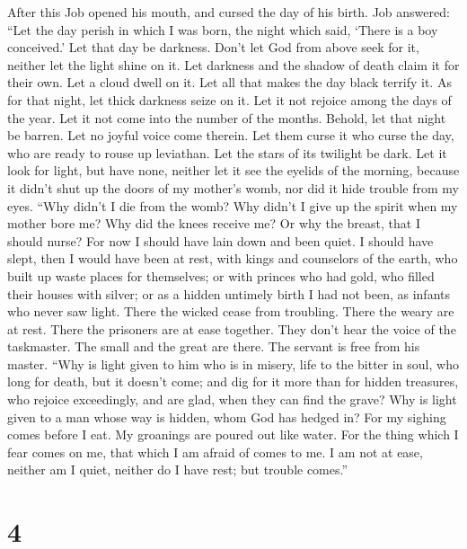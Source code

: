  After this Job opened his mouth, and cursed the day of his
birth.  Job answered:  ``Let the day perish in
which I was born, the night which said, `There is a boy conceived.'
 Let that day be darkness. Don't let God from above seek for
it, neither let the light shine on it.  Let darkness and the
shadow of death claim it for their own. Let a cloud dwell on it. Let all
that makes the day black terrify it.  As for that night, let
thick darkness seize on it. Let it not rejoice among the days of the
year. Let it not come into the number of the months. 
Behold, let that night be barren. Let no joyful voice come therein.
 Let them curse it who curse the day, who are ready to rouse
up leviathan.  Let the stars of its twilight be dark. Let it
look for light, but have none, neither let it see the eyelids of the
morning,  because it didn't shut up the doors of my
mother's womb, nor did it hide trouble from my eyes.  ``Why
didn't I die from the womb? Why didn't I give up the spirit when my
mother bore me?  Why did the knees receive me? Or why the
breast, that I should nurse?  For now I should have lain
down and been quiet. I should have slept, then I would have been at
rest,  with kings and counselors of the earth, who built up
waste places for themselves;  or with princes who had gold,
who filled their houses with silver;  or as a hidden
untimely birth I had not been, as infants who never saw light.
 There the wicked cease from troubling. There the weary are
at rest.  There the prisoners are at ease together. They
don't hear the voice of the taskmaster.  The small and the
great are there. The servant is free from his master. 
``Why is light given to him who is in misery, life to the bitter in
soul,  who long for death, but it doesn't come; and dig for
it more than for hidden treasures,  who rejoice
exceedingly, and are glad, when they can find the grave? 
Why is light given to a man whose way is hidden, whom God has hedged in?
 For my sighing comes before I eat. My groanings are poured
out like water.  For the thing which I fear comes on me,
that which I am afraid of comes to me.  I am not at ease,
neither am I quiet, neither do I have rest; but trouble comes.''

\hypertarget{section-3}{%
\section{4}\label{section-3}}

